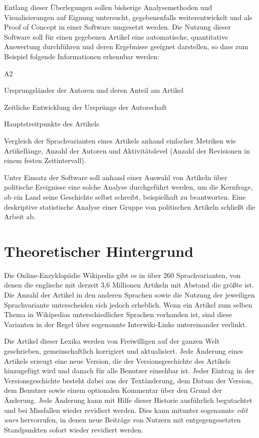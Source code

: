 Entlang dieser Überlegungen sollen bisherige Analysemethoden und Visualisierungen auf Eignung untersucht, gegebenenfalls weiterentwickelt und als Proof of Concept in einer Software umgesetzt werden.
Die Nutzung dieser Software soll für einen gegebenen Artikel eine automatische, quantitative Auswertung durchführen und deren Ergebnisse geeignet darstellen, so dass zum Beispiel folgende Informationen erkennbar werden:

\begin{labeling}{A2}
\item[A1] Ursprungsländer der Autoren und deren Anteil am Artikel
\item[A2] Zeitliche Entwicklung der Ursprünge der Autorschaft
\item[A3] Hauptstreitpunkte des Artikels
\item[A4] Vergleich der Sprachvarianten eines Artikels anhand einfacher Metriken wie Artikellänge, Anzahl der Autoren und Aktivitätslevel (Anzahl der Revisionen in einem festen Zeitintervall).
\end{labeling}

Unter Einsatz der Software soll anhand einer Auswahl von Artikeln über politische Ereignisse eine solche Analyse durchgeführt werden, um die Kernfrage, ob ein Land seine Geschichte selbst schreibt, beispielhaft zu beantworten. 
Eine deskriptive statistische Analyse einer Gruppe von politischen Artikeln schließt die Arbeit ab. 


\section{Theoretischer Hintergrund}

Die Online-Enzyklopädie Wikipedia gibt es in über 260 Sprachvarianten, von denen die englische mit derzeit 3,6 Millionen Artikeln mit Abstand die größte ist.
Die Anzahl der Artikel in den anderen Sprachen sowie die Nutzung der jeweiligen Sprachvariante unterscheiden sich jedoch erheblich.\cite{wikistats}
Wenn ein Artikel zum selben Thema in Wikipedias unterschiedlicher Sprachen vorhanden ist, sind diese Varianten in der Regel über sogenannte Interwiki-Links untereinander verlinkt.

Die Artikel dieser Lexika werden von Freiwilligen auf der ganzen Welt geschrieben, gemeinschaftlich korrigiert und aktualisiert.
Jede Änderung eines Artikels erzeugt eine neue Version, die der Versionsgeschichte des Artikels hinzugefügt wird und danach für alle Benutzer einsehbar ist.
Jeder Eintrag in der Versionsgeschichte besteht dabei aus der Textänderung, dem Datum der Version, dem Benutzer sowie einem optionalen Kommentar über den Grund der Änderung.
Jede Änderung kann mit Hilfe dieser Historie ausführlich begutachtet und bei Missfallen wieder revidiert werden. 
Dies kann mitunter sogenannte \emph{edit wars} hervorrufen, in denen neue Beiträge von Nutzern mit entgegengesetzten Standpunkten sofort wieder revidiert werden.\cite{suh2007us} 

